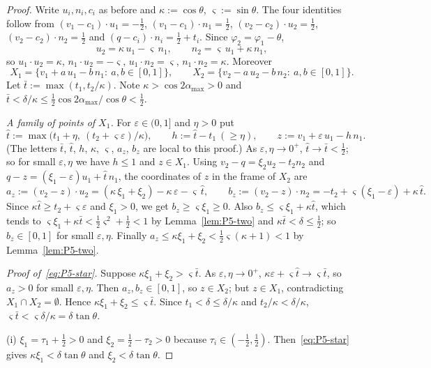 \documentclass[11pt]{amsart}
\newcommand{\amax}{\alpha_{\max}}
\theoremstyle{definition}
\theoremstyle{remark}
\numberwithin{equation}{section}
\begin{document}
\begin{proof}
Write $u_i,n_i,c_i$ as before and $\kappa:=\cos\theta$, $\varsigma:=\sin\theta$. The four identities follow from $(v_1-c_1)\cdot u_1=-\frac12$, $(v_1-c_1)\cdot n_1=\frac12$, $(v_2-c_2)\cdot u_2=\frac12$, $(v_2-c_2)\cdot n_2=\frac12$ and $(q-c_i)\cdot n_i=\frac12+t_i$. Since $\varphi_2=\varphi_1-\theta$,
\[
u_2=\kappa\,u_1-\varsigma\,n_1,\qquad n_2=\varsigma\,u_1+\kappa\,n_1,
\]
so $u_1\cdot u_2=\kappa$, $n_1\cdot u_2=-\varsigma$, $u_1\cdot n_2=\varsigma$, $n_1\cdot n_2=\kappa$. Moreover
\[
X_1=\{v_1+a\,u_1-b\,n_1:\ a,b\in[0,1]\},\qquad X_2=\{v_2-a\,u_2-b\,n_2:\ a,b\in[0,1]\}.
\]
Let $\bar t:=\max(t_1,t_2/\kappa)$. Note $\kappa>\cos2\amax>0$ and $\bar t<\delta/\kappa\le\frac12\cos2\amax/\cos\theta<\frac12$.

\emph{A family of points of $X_1$.} For $\varepsilon\in(0,1]$ and $\eta>0$ put
\[
\hat t:=\max\big(t_1+\eta,\ (t_2+\varsigma\varepsilon)/\kappa\big),\qquad h:=\hat t-t_1\ (\ge\eta),\qquad z:=v_1+\varepsilon\,u_1-h\,n_1 .
\]
(The letters $\bar t$, $\hat t$, $h$, $\kappa$, $\varsigma$, $a_z$, $b_z$ are local to this proof.) As $\varepsilon,\eta\to0^+$, $\hat t\to\bar t<\frac12$; so for small $\varepsilon,\eta$ we have $h\le1$ and $z\in X_1$. Using $v_2-q=\xi_2u_2-t_2n_2$ and $q-z=(\xi_1-\varepsilon)u_1+\hat t\,n_1$, the coordinates of $z$ in the frame of $X_2$ are
\[
a_z:=(v_2-z)\cdot u_2=(\kappa\,\xi_1+\xi_2)-\kappa\,\varepsilon-\varsigma\,\hat t,\qquad
b_z:=(v_2-z)\cdot n_2=-t_2+\varsigma(\xi_1-\varepsilon)+\kappa\,\hat t .
\]
Since $\kappa\hat t\ge t_2+\varsigma\varepsilon$ and $\xi_1>0$, we get $b_z\ge\varsigma\xi_1\ge0$. Also $b_z\le\varsigma\xi_1+\kappa\hat t$, which tends to $\varsigma\xi_1+\kappa\bar t<\frac12\varsigma^2+\frac12<1$ by Lemma~\ref{lem:P5-two} and $\kappa\bar t<\delta\le\frac12$; so $b_z\in[0,1]$ for small $\varepsilon,\eta$. Finally $a_z\le\kappa\xi_1+\xi_2<\frac12\varsigma(\kappa+1)<1$ by Lemma~\ref{lem:P5-two}.

\emph{Proof of~\eqref{eq:P5-star}.} Suppose $\kappa\xi_1+\xi_2>\varsigma\bar t$. As $\varepsilon,\eta\to0^+$, $\kappa\varepsilon+\varsigma\hat t\to\varsigma\bar t$, so $a_z>0$ for small $\varepsilon,\eta$. Then $a_z,b_z\in[0,1]$, so $z\in X_2$; but $z\in X_1$, contradicting $X_1\cap X_2=\emptyset$. Hence $\kappa\xi_1+\xi_2\le\varsigma\bar t$. Since $t_1<\delta\le\delta/\kappa$ and $t_2/\kappa<\delta/\kappa$, $\varsigma\bar t<\varsigma\delta/\kappa=\delta\tan\theta$.

(i) $\xi_1=\tau_1+\frac12>0$ and $\xi_2=\frac12-\tau_2>0$ because $\tau_i\in(-\frac12,\frac12)$. Then~\eqref{eq:P5-star} gives $\kappa\xi_1<\delta\tan\theta$ and $\xi_2<\delta\tan\theta$.


\end{proof}
\end{document}
